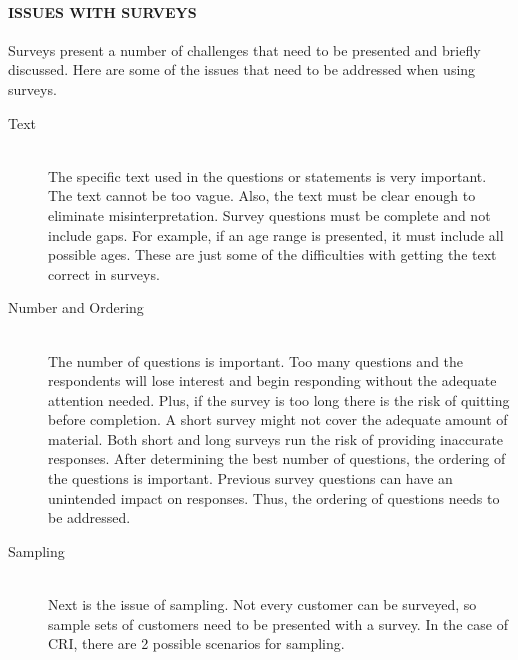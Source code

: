 \documentclass[SDSUThesis.tex]{subfiles}
\begin{document}
            \paragraph{ISSUES WITH SURVEYS}
                Surveys present a number of challenges that need to be presented and briefly
                discussed.  Here are some of the issues that need to be addressed when
                using surveys. 
                
                \begin{description}
                \item[Text] \hfill \\
                    The specific text used in the questions or statements
                    is very important.  The text cannot be too vague.  Also, the text
                    must be clear enough to eliminate misinterpretation. Survey
                    questions must be complete and not include gaps.  For example, if
                    an age range is presented, it must include all possible ages.  These
                    are just some of the difficulties with getting the text correct
                    in surveys. 
                \item[Number and Ordering] \hfill \\
                    The number of questions is important.  Too many questions and the 
                    respondents will lose interest and begin responding without the
                    adequate attention needed.  Plus, if the survey is too long there
                    is the risk of quitting before completion.  A short survey might
                    not cover the adequate amount of material.  Both short and long
                    surveys run the risk of providing inaccurate responses.  After
                    determining the best number of questions, the ordering of the questions
                    is important.  Previous survey questions can have an unintended 
                    impact on responses.  Thus, the ordering of questions needs to be
                    addressed. 
                \item[Sampling] \hfill \\
                    Next is the issue of sampling.  Not every customer can be surveyed, so 
                    sample sets of customers need to be presented with a survey.  
                    In the case of CRI, there are 2 possible scenarios for sampling.  
                    \begin{description}

\end{description}
\end{description}
\end{document}

